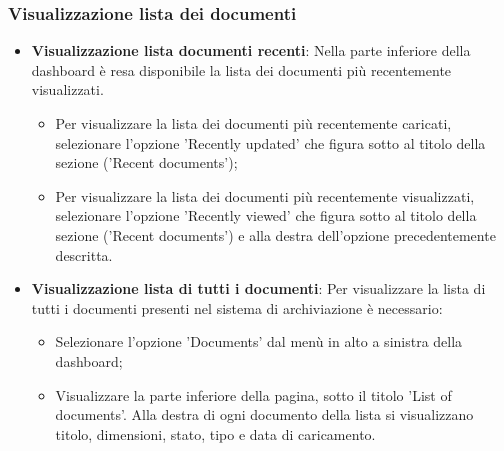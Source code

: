 \documentclass[10pt, a4paper]{article}
\begin{document}
\subsubsection{Visualizzazione lista dei documenti}
\begin{itemize}
    \item \textbf{Visualizzazione lista documenti recenti}: Nella parte inferiore della dashboard è resa disponibile la lista dei documenti più recentemente visualizzati.
    \begin{itemize}
        \item Per visualizzare la lista dei documenti più recentemente caricati, selezionare l'opzione 'Recently updated' che figura sotto al titolo della sezione ('Recent documents');
        \item Per visualizzare la lista dei documenti più recentemente visualizzati, selezionare l'opzione 'Recently viewed' che figura sotto al titolo della sezione ('Recent documents') e alla destra dell'opzione precedentemente descritta.
    \end{itemize}
    \item \textbf{Visualizzazione lista di tutti i documenti}: Per visualizzare la lista di tutti i documenti presenti nel sistema di archiviazione è necessario:
    \begin{itemize}
        \item Selezionare l'opzione 'Documents' dal menù in alto a sinistra della dashboard;
        \item Visualizzare la parte inferiore della pagina, sotto il titolo 'List of documents'. Alla destra di ogni documento della lista si visualizzano titolo, dimensioni, stato, tipo e data di caricamento.
    \end{itemize}
\end{itemize}
\end{document}
